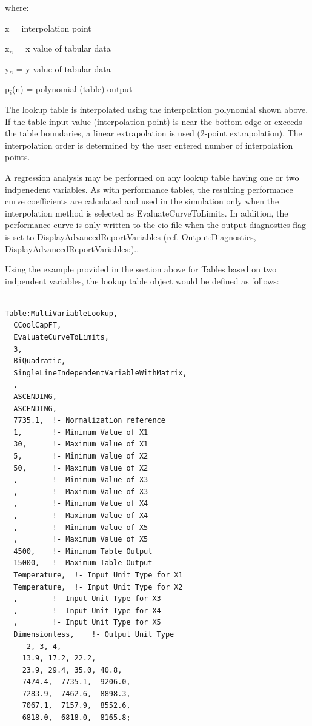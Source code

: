 where:

x = interpolation point

x\(_{n}\) = x value of tabular data

y\(_{n}\) = y value of tabular data

p\(_{i}\)(n) = polynomial (table) output

The lookup table is interpolated using the interpolation polynomial shown above. If the table input value (interpolation point) is near the bottom edge or exceeds the table boundaries, a linear extrapolation is used (2-point extrapolation). The interpolation order is determined by the user entered number of interpolation points.

A regression analysis may be performed on any lookup table having one or two indpenedent variables. As with performance tables, the resulting performance curve coefficients are calculated and used in the simulation only when the interpolation method is selected as EvaluateCurveToLimits. In addition, the performance curve is only written to the eio file when the output diagnostics flag is set to DisplayAdvancedReportVariables (ref. Output:Diagnostics, DisplayAdvancedReportVariables;)..

Using the example provided in the section above for Tables based on two indpendent variables, the lookup table object would be defined as follows:

\begin{lstlisting}

Table:MultiVariableLookup,
  CCoolCapFT,
  EvaluateCurveToLimits,
  3,
  BiQuadratic,
  SingleLineIndependentVariableWithMatrix,
  ,
  ASCENDING,
  ASCENDING,
  7735.1,  !- Normalization reference
  1,       !- Minimum Value of X1
  30,      !- Maximum Value of X1
  5,       !- Minimum Value of X2
  50,      !- Maximum Value of X2
  ,        !- Minimum Value of X3
  ,        !- Maximum Value of X3
  ,        !- Minimum Value of X4
  ,        !- Maximum Value of X4
  ,        !- Minimum Value of X5
  ,        !- Maximum Value of X5
  4500,    !- Minimum Table Output
  15000,   !- Maximum Table Output
  Temperature,  !- Input Unit Type for X1
  Temperature,  !- Input Unit Type for X2
  ,        !- Input Unit Type for X3
  ,        !- Input Unit Type for X4
  ,        !- Input Unit Type for X5
  Dimensionless,    !- Output Unit Type
     2, 3, 4,
    13.9, 17.2, 22.2,
    23.9, 29.4, 35.0, 40.8,
    7474.4,  7735.1,  9206.0,
    7283.9,  7462.6,  8898.3,
    7067.1,  7157.9,  8552.6,
    6818.0,  6818.0,  8165.8;
\end{lstlisting}
